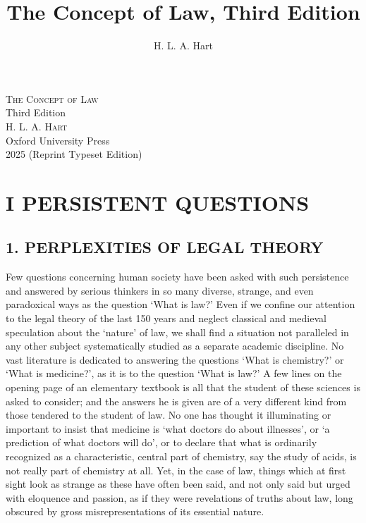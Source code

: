 \documentclass[12pt,oneside]{book}  %
\title{The Concept of Law, Third Edition}
\author{H. L. A. Hart}
\date{}
\begin{document}
\begin{titlepage}
  \centering
  \vspace*{3cm}
  {\Huge\textsc{The Concept of Law}}\\[1.5ex]
  {\Large Third Edition}\\[4ex]
  \textsc{H. L. A. Hart}\\[6ex]
  {\small Oxford University Press\\
  2025 (Reprint Typeset Edition)}
  \vfill
\end{titlepage}


\section{\texorpdfstring{\textbf{I PERSISTENT
QUESTIONS}}{I PERSISTENT QUESTIONS}}\label{i-persistent-questions}

\subsection{\texorpdfstring{\textbf{1. PERPLEXITIES OF LEGAL
THEORY}}{1. PERPLEXITIES OF LEGAL THEORY}}\label{perplexities-of-legal-theory}

Few questions concerning human society have been asked with such
persistence and answered by serious thinkers in so many diverse,
strange, and even paradoxical ways as the question `What is law?' Even
if we confine our attention to the legal theory of the last 150 years
and neglect classical and medieval speculation about the `nature' of
law, we shall find a situation not paralleled in any other subject
systematically studied as a separate academic discipline. No vast
literature is dedicated to answering the questions `What is chemistry?'
or `What is medicine?', as it is to the question `What is law?' A few
lines on the opening page of an elementary textbook is all that the
student of these sciences is asked to consider; and the answers he is
given are of a very different kind from those tendered to the student of
law. No one has thought it illuminating or important to insist that
medicine is `what doctors do about illnesses', or `a prediction of what
doctors will do', or to declare that what is ordinarily recognized as a
characteristic, central part of chemistry, say the study of acids, is
not really part of chemistry at all. Yet, in the case of law, things
which at first sight look as strange as these have often been said, and
not only said but urged with eloquence and passion, as if they were
revelations of truths about law, long obscured by gross
misrepresentations of its essential nature.
\end{document}
